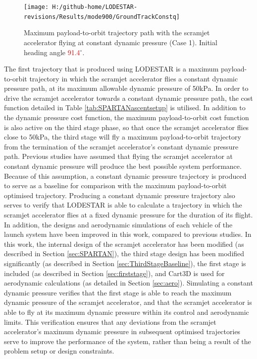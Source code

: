 \begin{figure}[ht]%
	\centering
	\texttt{[image: H:/github-home/LODESTAR-revisions/Results/mode900/GroundTrackConstq]}
	\caption{Maximum payload-to-orbit trajectory path with the scramjet accelerator flying at constant dynamic pressure (Case 1). Initial heading angle \textcolor{red}{91.4}$^\circ$.}
	\label{fig:GroundTrackConstq}
\end{figure}

The first trajectory that is produced using LODESTAR is a maximum payload-to-orbit trajectory in which the scramjet accelerator flies a constant dynamic pressure path, at its maximum allowable dynamic pressure of 50kPa. In order to drive the scramjet accelerator towards a constant dynamic pressure path, the cost function detailed in Table \ref{tab:SPARTANascentsetup} is utilised. In addition to the dynamic pressure cost function, the maximum payload-to-orbit cost function is also active on the third stage phase, so that once the scramjet accelerator flies close to 50kPa, the third stage will fly a maximum payload-to-orbit trajectory from the termination of the scramjet accelerator's constant dynamic pressure path.
Previous studies have assumed that flying the scramjet accelerator at constant dynamic pressure will produce the best possible system performance\cite{Preller2017b}. Because of this assumption, a constant dynamic pressure trajectory is produced to serve as a baseline for comparison with the maximum payload-to-orbit optimised trajectory. Producing a constant dynamic pressure trajectory also serves to verify that LODESTAR is able to calculate a trajectory in which the scramjet accelerator flies at a fixed dynamic pressure for the duration of its flight. 
In addition, the designs and aerodynamic simulations of each vehicle of the launch system have been improved in this work, compared to previous studies\cite{Preller2017b}. In this work, the internal design of the scramjet accelerator has been modified (as described in Section \ref{sec:SPARTAN}), the third stage design has been modified significantly (as described in Section \ref{sec:ThirdStageBaseline}), the first stage is included (as described in Section \ref{sec:firststage}), and Cart3D\cite{CART3D} is used for aerodynamic calculations (as detailed in Section \ref{sec:aero}). Simulating a constant dynamic pressure verifies that the first stage is able to reach the maximum dynamic pressure of the scramjet accelerator, and that the scramjet accelerator is able to fly at its maximum dynamic pressure within its control and aerodynamic limits. This verification ensures that any deviations from the scramjet accelerator's maximum dynamic pressure in subsequent optimised trajectories serve to improve the performance of the system, rather than being a result of the problem setup or design constraints. 

